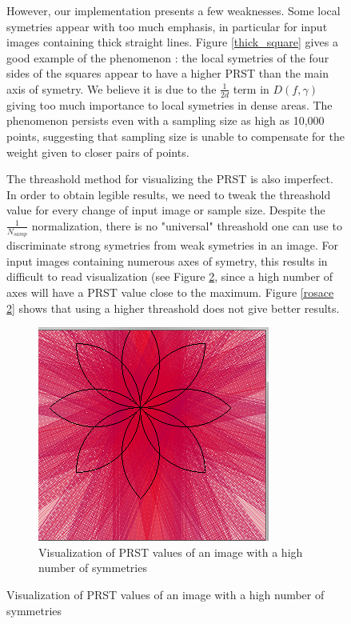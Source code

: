 \documentclass[10pt,a4paper]{article}			%
\begin{document}
\begin{figure}[h]
However, our implementation presents a few weaknesses. Some local symetries appear with too much emphasis, in particular for input images containing thick straight lines. Figure \ref{thick_square} gives a good example of the phenomenon : the local symetries of the four sides of the squares appear to have a higher PRST than the main axis of symetry. We believe it is due to the $\frac{1}{2d}$ term in $D(f,\gamma)$ giving too much importance to local symetries in dense areas. The phenomenon persists even with a sampling size as high as 10,000 points, suggesting that sampling size is unable to compensate for the weight given to closer pairs of points.

The threashold method for visualizing the PRST is also imperfect. In order to obtain legible results, we need to tweak the threashold value for every change of input image or sample size. Despite the $\frac{1}{N_{samp}}$ normalization, there is no "universal" threashold one can use to discriminate strong symetries from weak symetries in an image. For input images containing numerous axes of symetry, this results in difficult to read visualization (see Figure \ref{rosace}, since a high number of axes will have a PRST value close to the maximum. Figure \ref{rosace 2} shows that using a higher threashold does not give better results.

\begin{figure}[h]
\centering
 \includegraphics[scale = 0.7]{img/rosace_5000.png}
 \caption{Visualization of PRST values of an image with a high number of symmetries}
 \label{rosace}
\end{figure}



\end{figure}
\end{document}
